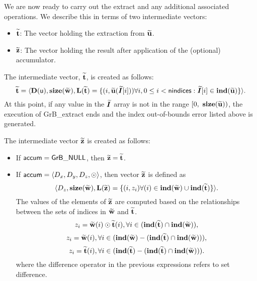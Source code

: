 We are now ready to carry out the extract and any additional 
associated operations.  We describe this in terms of two intermediate vectors:
\begin{itemize}
	\item ${\bf \widetilde{t}}$: The vector holding the extraction from
    ${\bf \widetilde{u}}$.
	\item ${\bf \widetilde{z}}$: The vector holding the result after 
    application of the (optional) accumulator.
\end{itemize}

The intermediate vector, ${\bf \widetilde{t}}$, is created as follows:
\[ 
{\bf \widetilde{t}} = \langle
\bold{D}({\sf u}), \bold{size}({\bf \widetilde{w}}),
\bold{L}({\bf \widetilde{t}}) =
\{(i,{\bf \widetilde{u}}(\bm{\widetilde{I}}[i])) \forall i, 0 \leq i < {\sf nindices} : 
\bm{\widetilde{I}}[i] \in \bold{ind}({\bf \widetilde{u}}) \} \rangle. 
\]
At this point, if any value in the $\bm{\widetilde{I}}$ array is not in
the range $[0,\ \bold{size}(\vector{\widetilde{u}}) )$, the execution of 
{\sf GrB\_extract} ends and the index out-of-bounds error listed above is 
generated.  

The intermediate vector ${\bf \widetilde{z}}$ is created as follows:
\begin{itemize}
    \item If ${\sf accum} = {\sf GrB\_NULL}$, then ${\bf \widetilde{z}} = {\bf \widetilde{t}}$.

    \item If ${\sf accum} = \langle D_x, D_y, D_z, \odot \rangle$, then vector ${\bf \widetilde{z}}$ is defined as 
        \[ \langle D_z, \bold{size}({\bf \widetilde{w}}), \bold{L}({\bf \widetilde{z}})
		= \{(i,z_{i})  \forall (i) \in \bold{ind}({\bf \widetilde{w}}) \cup 
        \bold{ind}({\bf \widetilde{t}}) \} \rangle.\]
    The values of the elements of ${\bf \widetilde{z}}$ are computed based on the relationships between the sets of indices in ${\bf \widetilde{w}}$ and ${\bf \widetilde{t}}$.
\[
z_{i} = {\bf \widetilde{w}}(i) \odot {\bf \widetilde{t}}(i), \forall i \in  (\bold{ind}({\bf \widetilde{t}}) \cap \bold{ind}({\bf \widetilde{w}})),
\]
\[
z_{i} = {\bf \widetilde{w}}(i), \forall  i \in  (\bold{ind}({\bf \widetilde{w}}) - (\bold{ind}({\bf \widetilde{t}}) \cap \bold{ind}({\bf \widetilde{w}}))),
\]
\[
z_{i} = {\bf \widetilde{t}}(i), \forall  i \in  (\bold{ind}({\bf \widetilde{t}}) - (\bold{ind}({\bf \widetilde{t}}) \cap \bold{ind}({\bf \widetilde{w}}))).
\]
where the difference operator in the previous expressions refers to set difference.
\end{itemize}

